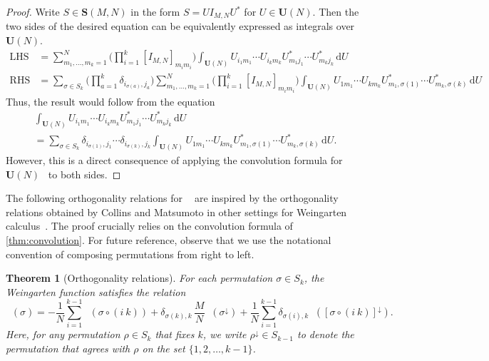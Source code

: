\documentclass[a4paper]{article}
\theoremstyle{plain}
\newtheorem{theorem}{Theorem}
\numberwithin{theorem}{section}
\theoremstyle{definition}
\theoremstyle{remark}
\newcommand{\dd}{\mathrm{d}}
\newcommand{\UM}{\mathbf{U}}			%
\newcommand{\um}{U}					%
\newcommand{\SM}{\mathbf{S}}			%
\DeclareMathOperator{\SW}{Wg^{\SM}}		%
\newcommand{\SG}{S} 					%
\begin{document}
\begin{proof}
Write $S \in \SM(M,N)$ in the form $S = UI_{M,N}U^*$ for $U \in \UM(N)$. Then the two sides of the desired equation can be equivalently expressed as integrals over $\UM(N)$.
\begin{align*}
\text{LHS} &= \sum_{m_1, \ldots, m_k = 1}^N \bigg(\prod_{i=1}^k \left[I_{M,N}\right]_{m_im_i} \bigg) \int_{\UM(N)} \um_{i_1m_1} \cdots \um_{i_km_k} \um_{m_1j_1}^* \cdots \um_{m_kj_k}^* \, \dd \um \\
\text{RHS} &= \sum_{\sigma \in \SG_k} \bigg( \prod_{a=1}^k \delta_{i_{\sigma(a)},j_a} \bigg) \sum_{m_1, \ldots, m_k = 1}^N \bigg(\prod_{i=1}^k \left[I_{M,N}\right]_{m_im_i} \bigg) \int_{\UM(N)} \um_{1m_1} \cdots \um_{km_k} \um_{m_1,\sigma(1)}^* \cdots \um_{m_k,\sigma(k)}^* \, \dd \um
\end{align*}
Thus, the result would follow from the equation
\begin{multline*}
\int_{\UM(N)} \um_{i_1m_1} \cdots \um_{i_km_k} \um_{m_1j_1}^* \cdots \um_{m_kj_k}^* \, \dd \um \\
= \sum_{\sigma \in \SG_k} \delta_{i_{\sigma(1)},j_1} \cdots \delta_{i_{\sigma(k)},j_k} \int_{\UM(N)} \um_{1m_1} \cdots \um_{km_k} \um_{m_1,\sigma(1)}^* \cdots \um_{m_k,\sigma(k)}^* \, \dd \um.
\end{multline*}
However, this is a direct consequence of applying the convolution formula for $\UM(N)$~\cite[Corollary~2.4]{col-sni06} to both sides.
\end{proof}


The following orthogonality relations for $\SW$ are inspired by the orthogonality relations obtained by Collins and Matsumoto in other settings for Weingarten calculus~\cite{col-mat17}. The proof crucially relies on the convolution formula of \cref{thm:convolution}. For future reference, observe that we use the notational convention of composing permutations from right to left.


\begin{theorem}[Orthogonality relations] \label{thm:orthogonality}
For each permutation $\sigma \in S_k$, the Weingarten function satisfies the relation
\[
\SW(\sigma) = -\frac{1}{N} \sum_{i=1}^{k-1} \SW(\sigma \circ (i~k)) + \delta_{\sigma(k),k} \, \frac{M}{N} \SW(\sigma^\downarrow) + \frac{1}{N} \sum_{i=1}^{k-1} \delta_{\sigma(i),k} \SW([\sigma \circ (i~k) ]^\downarrow).
\]
Here, for any permutation $\rho \in \SG_k$ that fixes $k$, we write $\rho^\downarrow \in \SG_{k-1}$ to denote the permutation that agrees with $\rho$ on the set $\{1, 2, \ldots, k-1\}$.
\end{theorem}
\end{document}
